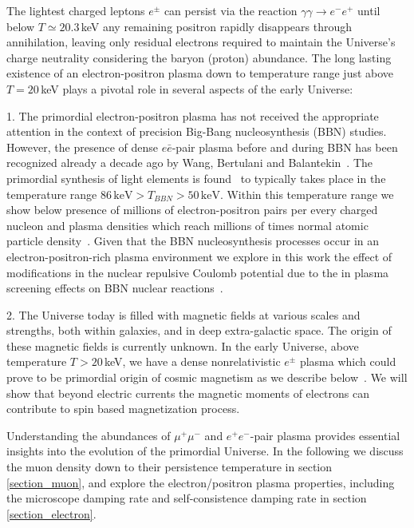 The lightest charged leptons $e^\pm$ can persist via the reaction $\gamma\gamma\to e^-e^+$ until below $T\simeq 20.3$\,keV any remaining positron rapidly disappears through annihilation, leaving only residual electrons required to maintain the Universe's charge neutrality considering the baryon (proton) abundance. The long lasting existence of an electron-positron plasma down to temperature range just above $T=20$\,keV plays a pivotal role in several aspects of the early Universe: 

1. The primordial electron-positron plasma has not received the appropriate attention in the context of precision Big-Bang nucleosynthesis (BBN) studies. However, the presence of dense $e\bar e$-pair plasma before and during BBN has been recognized already a decade ago by Wang, Bertulani and Balantekin~\cite{Wang:2010px}. The primordial synthesis of light elements is found~\cite{Pitrou:2018cgg} to typically takes place in the temperature range $86\,\mathrm{keV}>T_{BBN}>50\,\mathrm{keV}$. Within this temperature range we show below presence of millions of electron-positron pairs per every charged nucleon and plasma densities which reach millions of times normal atomic particle density~\cite{Yang:2024ret,Grayson:2023flr}. Given that the BBN nucleosynthesis processes occur in an electron-positron-rich plasma environment we explore in this work the effect of modifications in the nuclear repulsive Coulomb potential due to the in plasma screening effects on BBN nuclear reactions~\cite{Grayson:2024okq,Grayson:2024uwg}.  

2. The Universe today is filled with magnetic fields at various scales and strengths, both within galaxies, and in deep extra-galactic space. The origin of these magnetic fields is currently unknown. In the early Universe, above temperature $T>20$\,keV, we have a dense nonrelativistic  $e^\pm$ plasma which could prove to be primordial origin of cosmic magnetism as we describe below~\cite{Steinmetz:2023ucp,Rafelski:2023emw,Steinmetz:2023nsc}. We will show that beyond electric currents the magnetic moments of electrons can contribute to spin based magnetization process.

Understanding the abundances of $\mu^+\mu^-$ and $e^+e^-$-pair plasma provides essential insights into the evolution of the primordial Universe.  In the following we discuss the muon density down to their persistence temperature in section \ref{section_muon}, and explore the electron/positron plasma properties, including the microscope damping rate and self-consistence damping rate in section \ref{section_electron}.

